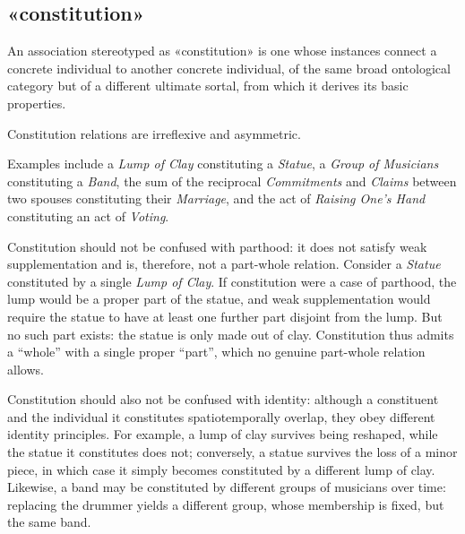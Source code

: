 


\subsection{«constitution»}
\label{stereotype:constitution}

An association stereotyped as «constitution» is one whose instances connect a concrete individual to another concrete individual, of the same broad ontological category but of a different ultimate sortal, from which it derives its basic properties.

Constitution relations are irreflexive and asymmetric. 

Examples include a \textit{Lump of Clay} constituting a \textit{Statue}, a \textit{Group of Musicians} constituting a \textit{Band}, the sum of the reciprocal \textit{Commitments} and \textit{Claims} between two spouses constituting their \textit{Marriage}, and the act of \textit{Raising One's Hand} constituting an act of \textit{Voting}.

Constitution should not be confused with parthood: it does not satisfy weak supplementation and is, therefore, not a part-whole relation. Consider a \textit{Statue} constituted by a single \textit{Lump of Clay}. If constitution were a case of parthood, the lump would be a proper part of the statue, and weak supplementation would require the statue to have at least one further part disjoint from the lump. But no such part exists: the statue is only made out of clay. Constitution thus admits a ``whole'' with a single proper ``part'', which no genuine part-whole relation allows.

Constitution should also not be confused with identity: although a constituent and the individual it constitutes spatiotemporally overlap, they obey different identity principles. For example, a lump of clay survives being reshaped, while the statue it constitutes does not; conversely, a statue survives the loss of a minor piece, in which case it simply becomes constituted by a different lump of clay. Likewise, a band may be constituted by different groups of musicians over time: replacing the drummer yields a different group, whose membership is fixed, but the same band.

